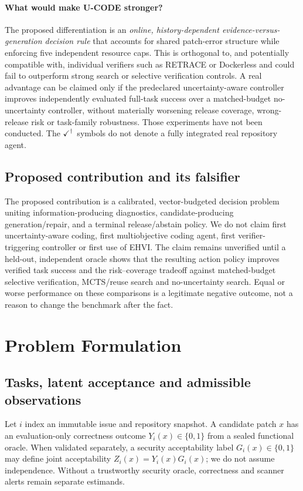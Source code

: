 \documentclass[pdflatex,sn-basic]{sn-jnl}
\newcommand{\methodPlan}{\ensuremath{\checkmark^{\dagger}}}
\begin{document}
\paragraph{What would make U-CODE stronger?}
The proposed differentiation is an \emph{online,
history-dependent evidence-versus-generation decision rule}
that accounts for shared patch-error structure while
enforcing five independent resource caps. This is
orthogonal to, and potentially compatible with, individual
verifiers such as RETRACE or Dockerless and could fail
to outperform strong search or selective verification
controls. A real advantage can be claimed only if the
predeclared uncertainty-aware controller improves
independently evaluated full-task success over a
matched-budget no-uncertainty controller, without
materially worsening release coverage, wrong-release
risk or task-family robustness. Those experiments
have not been conducted. The \methodPlan\ symbols
do not denote a fully integrated real repository agent.

\subsection{Proposed contribution and its falsifier}
The proposed contribution is a calibrated, vector-budgeted decision
problem uniting information-producing diagnostics, candidate-producing
generation/repair, and a terminal release/abstain policy. We do not
claim first uncertainty-aware coding, first multiobjective coding
agent, first verifier-triggering controller or first use of EHVI.
The claim remains unverified until a held-out, independent oracle
shows that the resulting action policy improves verified task
success and the risk--coverage tradeoff against matched-budget
selective verification, MCTS/reuse search and no-uncertainty search.
Equal or worse performance on these comparisons is a legitimate
negative outcome, not a reason to change the benchmark after the fact.

\section{Problem Formulation}\label{sec:formulation}

\subsection{Tasks, latent acceptance and admissible observations}

Let $i$ index an immutable issue and repository snapshot. A candidate
patch $x$ has an evaluation-only correctness outcome
$Y_i(x)\in\{0,1\}$ from a sealed functional oracle. When validated
separately, a security acceptability label $G_i(x)\in\{0,1\}$
may define joint acceptability $Z_i(x)=Y_i(x)G_i(x)$; we do not assume
independence. Without a trustworthy security oracle, correctness and
scanner alerts remain separate estimands.
\end{document}
